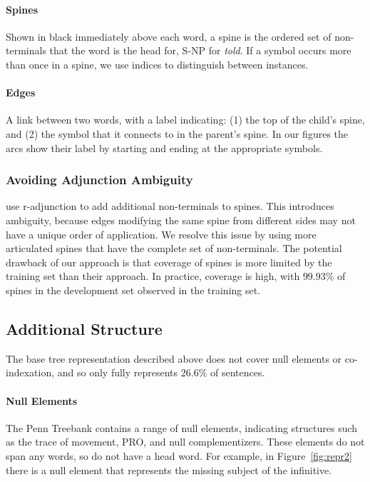\paragraph{Spines}
Shown in black immediately above each word, a spine is the ordered set of non-terminals that the word is the head for, \myeg S-NP for \emph{told}.
If a symbol occurs more than once in a spine, we use indices to distinguish between instances.

\paragraph{Edges}
A link between two words, with a label indicating: (1) the top of the child's spine, and (2) the symbol that it connects to in the parent's spine.
In our figures the arcs show their label by starting and ending at the appropriate symbols.

\subsubsection{Avoiding Adjunction Ambiguity}

\textcite{cck} use r-adjunction to add additional non-terminals to spines.
This introduces ambiguity, because edges modifying the same spine from different sides may not have a unique order of application.
We resolve this issue by using more articulated spines that have the complete set of non-terminals.
The potential drawback of our approach is that coverage of spines is more limited by the training set than their approach.
In practice, coverage is high, with $99.93\%$ of spines in the development set observed in the training set.

\subsection{Additional Structure} \label{sec:rep-other}

The base tree representation described above does not cover null elements or co-indexation, and so only fully represents $26.6\%$ of sentences.

\paragraph{Null Elements}
The Penn Treebank contains a range of null elements, indicating structures such as the trace of movement, PRO, and null complementizers.
These elements do not span any words, so do not have a head word.
For example, in Figure~\ref{fig:repr2} there is a null element that represents the missing subject of the infinitive.

